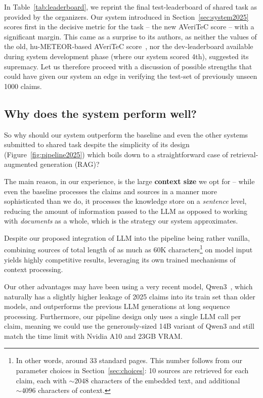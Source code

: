 In Table~\ref{tab:leaderboard}, we reprint the final test-leaderboard of \averitec{} shared task as provided by the organizers.
Our system introduced in Section~\ref{sec:system2025} scores first in the decisive metric for the task -- the new AVeriTeC score -- with a significant margin.
This came as a surprise to its authors, as neither the values of the old, hu-METEOR-based AVeriTeC score~\cite{averitec2024}, nor the dev-leaderboard available during system development phase (where our system scored 4th), suggested its supremacy.
Let us therefore proceed with a discussion of possible strengths that could have given our system an edge in verifying the \averitec{} test-set of previously unseen 1000 claims.

\subsection{Why does the system perform well?}
\label{sec:why}
So why should our system outperform the \averitec{} baseline and even the other systems submitted to \averitec{} shared task despite the simplicity of its design (Figure~\ref{fig:pipeline2025}) which boils down to a straightforward case of retrieval-augmented generation (RAG)?

The main reason, in our experience, is the large \textbf{context size} we opt for -- while even the \averitec{} baseline processes the claims and sources in a manner more sophisticated than we do, it processes the knowledge store on a \textit{sentence} level, reducing the amount of information passed to the LLM as opposed to working with \textit{documents} as a whole, which is the strategy our system approximates.

Despite our proposed integration of LLM into the pipeline being rather vanilla, combining sources of total length of as much as 60K characters\footnote{In other words, around 33 standard pages. This number follows from our parameter choices in Section~\ref{sec:choices}: 10 sources are retrieved for each claim, each with $\sim2048$ characters of the embedded text, and additional $\sim4096$ characters of context.} on model input yields highly competitive results, leveraging its own trained mechanisms of context processing.

Our other advantages may have been using a very recent model, Qwen3~\cite{yang2025qwen3technicalreport}, which naturally has a slightly higher leakage of 2025 claims into its train set than older models, and outperforms the previous LLM generations at long sequence processing. Furthermore, our pipeline design only uses a single LLM call per claim, meaning we could use the generously-sized 14B variant of Qwen3 and still match the time limit with Nvidia A10 and 23GB VRAM.

